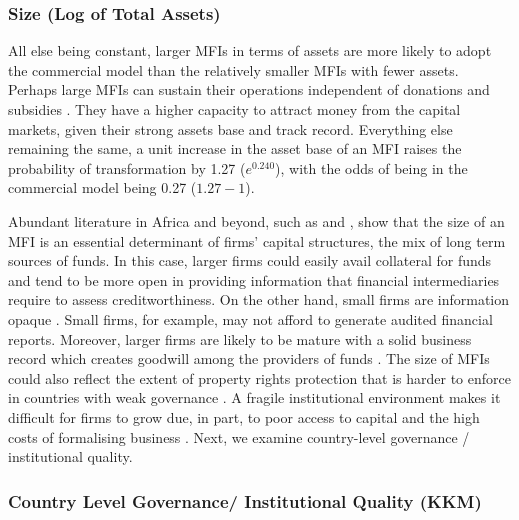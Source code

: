 \documentclass[a4paper,nobind]{templates/ociamthesis}
\begin{document}
\hypertarget{size-log-of-total-assets}{%
\subsubsection{Size (Log of Total Assets)}\label{size-log-of-total-assets}}

All else being constant, larger MFIs in terms of assets are more likely to adopt the commercial model than the relatively smaller MFIs with fewer assets. Perhaps large MFIs can sustain their operations independent of donations and subsidies \autocite{d2013unsubsidized}. They have a higher capacity to attract money from the capital markets, given their strong assets base and track record. Everything else remaining the same, a unit increase in the asset base of an MFI raises the probability of transformation by 1.27 (\(e^{0.240}\)), with the odds of being in the commercial model being 0.27 (\(1.27 - 1\)).

Abundant literature in Africa and beyond, such as \textcite{gwatidzo2009corporate} and \textcite{kodongo2015capital}, show that the size of an MFI is an essential determinant of firms' capital structures, the mix of long term sources of funds. In this case, larger firms could easily avail collateral for funds and tend to be more open in providing information that financial intermediaries require to assess creditworthiness. On the other hand, small firms are information opaque \autocite{beck2014sme,kersten2017small}. Small firms, for example, may not afford to generate audited financial reports. Moreover, larger firms are likely to be mature with a solid business record which creates goodwill among the providers of funds \autocite{beck2008finance}. The size of MFIs could also reflect the extent of property rights protection that is harder to enforce in countries with weak governance \autocite{johnson2002property,claessens2003financial}. A fragile institutional environment makes it difficult for firms to grow due, in part, to poor access to capital and the high costs of formalising business \autocite{hansen2004reconsidering}. Next, we examine country-level governance / institutional quality.

\hypertarget{country-level-governance-institutional-quality-kkm}{%
\subsubsection{Country Level Governance/ Institutional Quality (KKM)}\label{country-level-governance-institutional-quality-kkm}}
\end{document}
